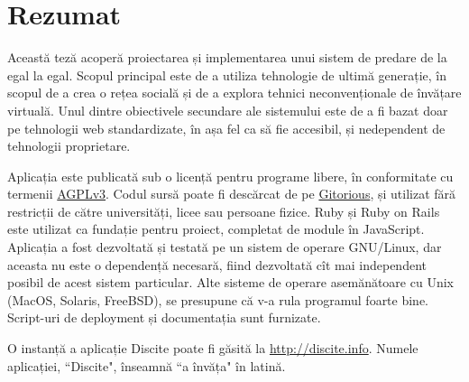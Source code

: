 \section*{Rezumat}
Această teză acoperă proiectarea și implementarea unui sistem de  predare de la egal la egal.
Scopul principal este de a utiliza tehnologie de ultimă generație, în scopul de a crea o
rețea socială și de a explora tehnici neconvenționale de învățare virtuală.
Unul dintre obiectivele secundare ale sistemului este de a fi bazat doar pe tehnologii web standardizate,
în așa fel ca să fie accesibil, și nedependent de tehnologii proprietare.

Aplicația este publicată sub o licență pentru programe libere, în conformitate cu termenii
\href{http://www.gnu.org/licenses/agpl-3.0.html}{AGPLv3}. Codul sursă poate fi
descărcat de pe \href {https://gitorious.org/discite/discite/}{Gitorious}, și
utilizat fără restricții de către universități, licee sau persoane fizice.
Ruby și Ruby on Rails este utilizat ca fundație pentru proiect, completat de module în JavaScript.
Aplicația a fost dezvoltată și testată pe un sistem de operare GNU/Linux, dar aceasta nu este o dependență necesară,
fiind dezvoltată cît mai independent posibil de acest sistem particular. Alte
sisteme de operare asemănătoare cu Unix (MacOS, Solaris, FreeBSD), se presupune
că v-a rula programul foarte bine. Script-uri de deployment
și documentația sunt furnizate.

O instanță a aplicație Discite poate fi găsită la \url{http://discite.info}.
Numele aplicației, ``Discite", înseamnă ``a învăța" în latină.

\clearpage

